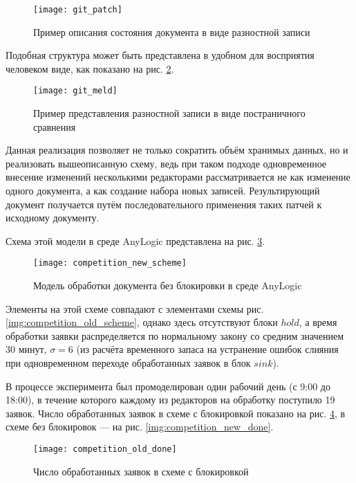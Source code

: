 \begin{figure}[h!]
  \centering
  \texttt{[image: git\_patch]}
  \caption{Пример описания состояния документа в виде разностной записи}
  \label{img:git_patch}
\end{figure}

Подобная структура может быть представлена в удобном для восприятия человеком виде, как показано на рис. \ref{img:git_meld}.
\begin{figure}[h!]
  \centering
  \texttt{[image: git\_meld]}
  \caption{Пример представления разностной записи в виде постраничного сравнения}
  \label{img:git_meld}
\end{figure}

Данная реализация позволяет не только сократить объём хранимых данных, но и реализовать вышеописанную схему, ведь при таком подходе одновременное внесение изменений несколькими редакторами рассматривается не как изменение одного документа, а как создание набора новых записей. Результирующий документ получается путём последовательного применения таких патчей к исходному документу.

\vspace{\baselineskip}
Схема этой модели в среде AnyLogic представлена на рис. \ref{img:competition_new_scheme}.

\begin{figure}[h!]
  \centering
  \texttt{[image: competition\_new\_scheme]}
  \caption{Модель обработки документа без блокировки в среде AnyLogic}
  \label{img:competition_new_scheme}
\end{figure}

\vspace{\baselineskip}
Элементы на этой схеме совпадают с элементами схемы рис. \ref{img:competition_old_scheme}, однако здесь отсутствуют блоки $hold$, а время обработки заявки распределяется по нормальному закону со средним значением 30 минут, $\sigma=6$ (из расчёта временного запаса на устранение ошибок слияния при одновременном переходе обработанных заявок в блок $sink$).

\vspace{\baselineskip}
В процессе эксперимента был промоделирован один рабочий день (с 9:00 до 18:00), в течение которого каждому из редакторов на обработку поступило 19 заявок. Число обработанных заявок в схеме с блокировкой показано на рис. \ref{img:competition_old_done}, в схеме без блокировок --- на рис. \ref{img:competition_new_done}.

\begin{figure}[h!]
  \centering
  \texttt{[image: competition\_old\_done]}
  \caption{Число обработанных заявок в схеме с блокировкой}
  \label{img:competition_old_done}
\end{figure}

